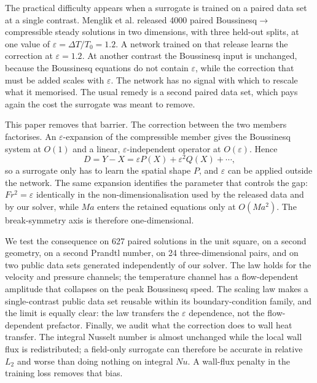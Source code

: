 \documentclass[preprint,11pt,a4paper,times,doubleblind]{elsarticle}
\begin{document}
The practical difficulty appears when a surrogate is trained on a paired data set at a single
contrast. Menglik et al. \citep{menglik2026neural} released 4000 paired
Boussinesq$\to$compressible steady
solutions in two dimensions, with three held-out splits, at one value of
$\varepsilon=\Delta T/T_0=1.2$. A network trained on that release learns the correction at
$\varepsilon=1.2$. At another contrast the Boussinesq input is unchanged, because the
Boussinesq equations do not contain $\varepsilon$, while the correction that must be added
scales with $\varepsilon$. The network has no signal with which to rescale what it memorised.
The usual remedy is a second paired data set, which pays again the cost the surrogate was meant
to remove.

This paper removes that barrier. The correction between the two members factorises. An
$\varepsilon$-expansion of the compressible member gives the Boussinesq system at $O(1)$ and a
linear, $\varepsilon$-independent operator at $O(\varepsilon)$. Hence
\begin{equation}
  D=Y-X=\varepsilon P(X)+\varepsilon^2 Q(X)+\cdots,
  \label{eq:factor}
\end{equation}
so a surrogate only has to learn the spatial shape $P$, and $\varepsilon$ can be applied
outside the network. The same expansion identifies the parameter that controls the gap:
$Fr^2=\varepsilon$ identically in the non-dimensionalisation used by the released data and by
our solver, while $Ma$ enters the retained equations only at $O(Ma^2)$. The break-symmetry
axis is therefore one-dimensional.

We test the consequence on 627 paired solutions in the unit square, on a second geometry, on a
second Prandtl number, on 24 three-dimensional pairs, and on two public data sets generated
independently of our solver. The law holds for the velocity and pressure channels; the temperature channel has a
flow-dependent amplitude that collapses on the peak Boussinesq speed. The scaling law makes a
single-contrast public data set reusable within its boundary-condition family, and the limit
is equally clear: the law transfers the $\varepsilon$ dependence, not the flow-dependent
prefactor. Finally, we audit what the correction does to wall heat transfer. The integral
Nusselt number is almost unchanged while the local wall flux is redistributed; a field-only
surrogate can therefore be accurate in relative $L_2$ and worse than doing nothing on integral
$Nu$. A wall-flux penalty in the training loss removes that bias.
\end{document}
